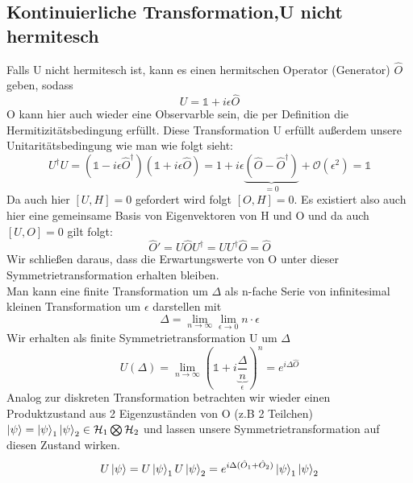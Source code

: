 \documentclass[Ex4_Zusammenfassung.tex]{subfiles}
\begin{document}
\subsection{Kontinuierliche Transformation,U nicht hermitesch}
Falls U nicht hermitesch ist, kann es einen hermitschen Operator (Generator) $\hat{O}$ geben, sodass
\begin{equation}
U = \mathds{1} + i \epsilon \hat{O}
\end{equation}
O kann hier auch wieder eine Observarble sein, die per Definition die Hermitizitätsbedingung erfüllt. Diese Transformation U erfüllt außerdem unsere Unitaritätsbedingung wie man wie folgt sieht:
\begin{equation}
U^{\dag} U = (\mathds{1} - i \epsilon \hat{O}^{\dag}) (\mathds{1} + i \epsilon \hat{O}) = 1 + i \epsilon \underbrace{(\hat{O} - \hat{O}^{\dag})}_{=0} + \mathcal O(\epsilon^2) = \mathds{1} 
\end{equation}
Da auch hier $[U,H]=0$ gefordert wird folgt $[O,H]=0$. Es existiert also auch hier eine gemeinsame Basis von Eigenvektoren von H und O und da auch $[U,O]=0$ gilt folgt:
\begin{equation}
\hat{O}' = U \hat{O} U^{\dag} = U U^{\dag} \hat{O} = \hat{O}
\end{equation}
Wir schließen daraus, dass die Erwartungswerte von O unter dieser Symmetrietransformation erhalten bleiben.\\ \newline
Man kann eine finite Transformation um $\Delta$ als n-fache Serie von infinitesimal kleinen Transformation um $\epsilon$ darstellen mit
\begin{equation}
\Delta = \lim_{n \rightarrow \infty} \lim_{\epsilon \rightarrow 0} n \cdot \epsilon
\end{equation}
Wir erhalten als finite Symmetrietransformation U um $\Delta$
\begin{equation}
U(\Delta)= \lim_{n\rightarrow \infty} \left( \mathds{1} + i \underbrace{\frac{\Delta}{n}}_{\epsilon}\right)^n = e^{i\Delta \hat{O}}
\end{equation}
Analog zur diskreten Transformation betrachten wir wieder einen Produktzustand aus 2 Eigenzuständen von O (z.B 2 Teilchen) $\ket{\psi} = \ket{\psi}_1 \ket{\psi}_2 \in \mathcal{H}_1 \bigotimes \mathcal{H}_2$ und lassen unsere Symmetrietransformation auf diesen Zustand wirken.
\begin{equation}
U \ket{\psi} = U \ket{\psi}_1 U \ket{\psi}_2 = e^{i\Delta(\hat{O}_1 + \hat{O}_2)} \ket{\psi}_1 \ket{\psi}_2
\end{equation}
\end{document}
